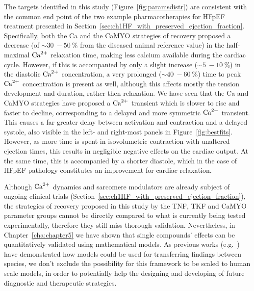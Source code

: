 \vspace{0.2cm}
The targets identified in this study (Figure~\ref{fig:paramsdistr}) are consistent with the common end point of the two example pharmacotherapies for HFpEF treatment presented in Section~\ref{sec:ch1HF_with_preserved_ejection_fraction}. Specifically, both the Ca and the CaMYO strategies of recovery proposed a decrease (of $\sim\SI{30}{}-\SI{50}{\percent}$ from the diseased animal reference value) in the half-maximal $\textrm{Ca}^{2+}$ relaxation time, making less calcium available during the cardiac cycle. However, if this is accompanied by only a slight increase ($\sim\SI{5}{}-\SI{10}{\percent}$) in the diastolic $\textrm{Ca}^{2+}$ concentration, a very prolonged ($\sim\SI{40}{}-\SI{60}{\percent}$) time to peak $\textrm{Ca}^{2+}$ concentration is present as well, although this affects mostly the tension development and duration, rather then relaxation. We have seen that the Ca and CaMYO strategies have proposed a $\textrm{Ca}^{2+}$ transient which is slower to rise and faster to decline, corresponding to a delayed and more symmetric $\textrm{Ca}^{2+}$ transient. This causes a far greater delay between activation and contraction and a delayed systole, also visible in the left- and right-most panels in Figure~\ref{fig:bestfits}. However, as more time is spent in isovolumetric contraction with unaltered ejection times, this results in negligible negative effects on the cardiac output. At the same time, this is accompanied by a shorter diastole, which in the case of HFpEF pathology constitutes an improvement for cardiac relaxation.

\vspace{0.2cm}
Although $\textrm{Ca}^{2+}$ dynamics and sarcomere modulators are already subject of ongoing clinical trials (Section~\ref{sec:ch1HF_with_preserved_ejection_fraction}), the strategies of recovery proposed in this study by the TNF, TKF and CaMYO parameter groups cannot be directly compared to what is currently being tested experimentally, therefore they still miss thorough validation. Nevertheless, in Chapter~\ref{cha:chapter5} we have shown that single compounds' effects can be quantitatively validated using mathematical models. As previous works (e.g.~\cite{Fernandez-Chas:2018}) have demonstrated how models could be used for transferring findings between species, we don't exclude the possibility for this framework to be scaled to human scale models, in order to potentially help the designing and developing of future diagnostic and therapeutic strategies.


%
%
%
